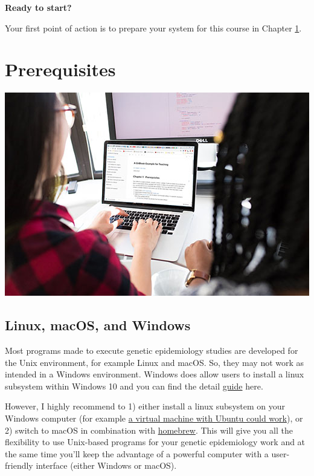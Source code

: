 \documentclass[
]{book}
\begin{document}
\textbf{Ready to start?}

Your first point of action is to prepare your system for this course in Chapter \ref{prerequisites}.

\hypertarget{prerequisites}{%
\chapter{Prerequisites}\label{prerequisites}}

\includegraphics{img/girls_behind_macbook.jpeg}

\hypertarget{linux-macos-and-windows}{%
\section{Linux, macOS, and Windows}\label{linux-macos-and-windows}}

Most programs made to execute genetic epidemiology studies are developed for the Unix environment, for example Linux and macOS. So, they may not work as intended in a Windows environment. Windows does allow users to install a linux subsystem within Windows 10 and you can find the detail \href{https://docs.microsoft.com/en-us/windows/wsl/about}{guide} here.

However, I highly recommend to 1) either install a linux subsystem on your Windows computer (for example \href{https://blog.storagecraft.com/the-dead-simple-guide-to-installing-a-linux-virtual-machine-on-windows/}{a virtual machine with Ubuntu could work}), or 2) switch to macOS in combination with \href{https://brew.sh}{homebrew}. This will give you all the flexibility to use Unix-based programs for your genetic epidemiology work and at the same time you'll keep the advantage of a powerful computer with a user-friendly interface (either Windows or macOS).
\end{document}
